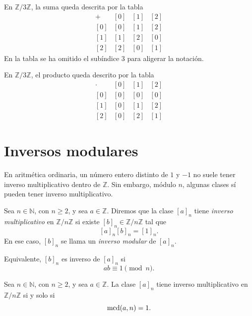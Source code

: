 \begin{ejemplo}
En \(\mathbb{Z}/3\mathbb{Z}\), la suma queda descrita por la tabla
\[
\begin{array}{c|ccc}
+ & {[0]} & {[1]} & {[2]} \\
\hline
{[0]} & {[0]} & {[1]} & {[2]} \\
{[1]} & {[1]} & {[2]} & {[0]} \\
{[2]} & {[2]} & {[0]} & {[1]}
\end{array}
\]
En la tabla se ha omitido el subíndice \(3\) para aligerar la notación.
\end{ejemplo}

\begin{ejemplo}
En \(\mathbb{Z}/3\mathbb{Z}\), el producto queda descrito por la tabla
\[
\begin{array}{c|ccc}
\cdot & {[0]} & {[1]} & {[2]} \\
\hline
{[0]} & {[0]} & {[0]} & {[0]} \\
{[1]} & {[0]} & {[1]} & {[2]} \\
{[2]} & {[0]} & {[2]} & {[1]}
\end{array}
\]
\end{ejemplo}

\section{Inversos modulares}

En aritmética ordinaria, un número entero distinto de \(1\) y \(-1\) no suele tener inverso multiplicativo dentro de \(\mathbb{Z}\). Sin embargo, módulo \(n\), algunas clases sí pueden tener inverso multiplicativo.

\begin{definicion}
Sea \(n\in\mathbb{N}\), con \(n\geq 2\), y sea \(a\in\mathbb{Z}\). Diremos que la clase \([a]_n\) tiene \emph{inverso multiplicativo} en \(\mathbb{Z}/n\mathbb{Z}\) si existe \([b]_n\in\mathbb{Z}/n\mathbb{Z}\) tal que
\[
  [a]_n[b]_n={[1]}_n.
\]
En ese caso, \([b]_n\) se llama un \emph{inverso modular} de \([a]_n\).
\end{definicion}

Equivalente, \([b]_n\) es inverso de \([a]_n\) si
\[
  ab\equiv 1\pmod n.
\]

\begin{teorema}
Sea \(n\in\mathbb{N}\), con \(n\geq 2\), y sea \(a\in\mathbb{Z}\). La clase \([a]_n\) tiene inverso multiplicativo en \(\mathbb{Z}/n\mathbb{Z}\) si y solo si
\[
  \operatorname{mcd}(a,n)=1.
\]
\end{teorema}

